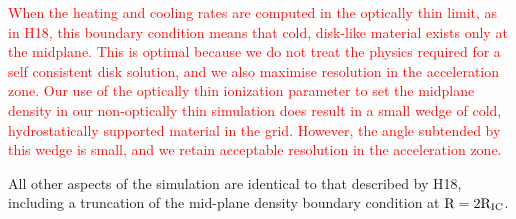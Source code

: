 \documentclass[a4paper,fleqn,usenatbib]{mnras}
\begin{document}
\textcolor{red}{When the heating and cooling rates are computed
 in the optically thin limit, as in H18, this boundary condition means 
 that cold, disk-like material exists only at the midplane. This is optimal
 because we do not treat the physics required for a self consistent 
 disk solution, and we also maximise resolution in the acceleration zone.
 Our use of the optically thin ionization parameter to set
 the midplane density in our non-optically thin simulation does result in a
small wedge of cold, hydrostatically supported material in the grid. However,
the angle subtended by this wedge is small, and we retain acceptable 
resolution in the acceleration zone.}

All other aspects of the simulation are identical to that described by
H18, including a truncation of the  mid-plane density boundary
condition at $\rm{R=2 R_{IC}}$.
\end{document}
